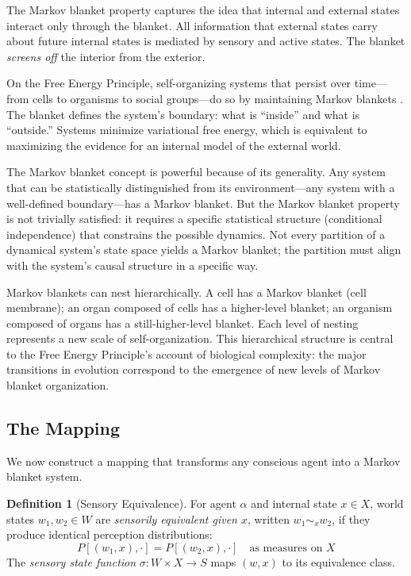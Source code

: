 \documentclass[11pt,a4paper]{article}
\theoremstyle{definition}
\newtheorem{definition}{Definition}[section]
\theoremstyle{plain}
\theoremstyle{remark}
\begin{document}
The Markov blanket property captures the idea that internal and external states interact only through the blanket. All information that external states carry about future internal states is mediated by sensory and active states. The blanket \textit{screens off} the interior from the exterior.

On the Free Energy Principle, self-organizing systems that persist over time---from cells to organisms to social groups---do so by maintaining Markov blankets \citep{Parr2022}. The blanket defines the system's boundary: what is ``inside'' and what is ``outside.'' Systems minimize variational free energy, which is equivalent to maximizing the evidence for an internal model of the external world.

The Markov blanket concept is powerful because of its generality. Any system that can be statistically distinguished from its environment---any system with a well-defined boundary---has a Markov blanket. But the Markov blanket property is not trivially satisfied: it requires a specific statistical structure (conditional independence) that constrains the possible dynamics. Not every partition of a dynamical system's state space yields a Markov blanket; the partition must align with the system's causal structure in a specific way.

Markov blankets can nest hierarchically. A cell has a Markov blanket (cell membrane); an organ composed of cells has a higher-level blanket; an organism composed of organs has a still-higher-level blanket. Each level of nesting represents a new scale of self-organization. This hierarchical structure is central to the Free Energy Principle's account of biological complexity: the major transitions in evolution correspond to the emergence of new levels of Markov blanket organization.

\subsection{The Mapping}\label{sec:mapping}

We now construct a mapping that transforms any conscious agent into a Markov blanket system.

\begin{definition}[Sensory Equivalence]
For agent $\alpha$ and internal state $x \in X$, world states $w_1, w_2 \in W$ are \emph{sensorily equivalent given $x$}, written $w_1 \sim_x w_2$, if they produce identical perception distributions:
$$P[(w_1, x), \cdot] = P[(w_2, x), \cdot] \quad \text{as measures on } X$$
The \emph{sensory state function} $\sigma: W \times X \to S$ maps $(w, x)$ to its equivalence class.
\end{definition}
\end{document}
